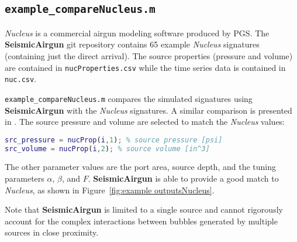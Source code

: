 \documentclass[10pt]{article}
\begin{document}
\subsection{\texttt{example\_compareNucleus.m}}
\emph{Nucleus} is a commercial airgun modeling software produced by PGS. The {\bf SeismicAirgun} git repository contains 65 example \emph{Nucleus} signatures (containing just the direct arrival). The source properties (pressure and volume) are contained in \texttt{nucProperties.csv} while the time series data is contained in \texttt{nuc.csv}.

\texttt{example\_compareNucleus.m} compares the simulated signatures using {\bf SeismicAirgun} with the \emph{Nucleus} signatures. A similar comparison is presented in \citet{Watson2017_airgun}. The source pressure and volume are selected to match the \emph{Nucleus} values:
\begin{lstlisting}[language=Matlab]
src_pressure = nucProp(i,1); % source pressure [psi]
src_volume = nucProp(i,2); % source volume [in^3]
\end{lstlisting}
The other parameter values are the port area, source depth, and the tuning parameters $\alpha$, $\beta$, and $F$. {\bf SeismicAirgun} is able to provide a good match to \emph{Nucleus}, as shown in Figure~\ref{fig:example outputsNucleus}. 

Note that {\bf SeismicAirgun} is limited to a single source and cannot rigorously account for the complex interactions between bubbles generated by multiple sources in close proximity. 
\end{document}
